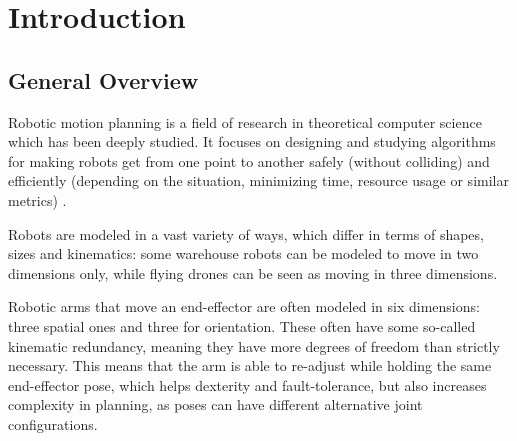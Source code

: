 \section{Introduction}


\subsection{General Overview}

Robotic motion planning is a field of research in theoretical computer science which has been deeply studied. 
It focuses on designing and studying algorithms for making robots get from one point to another safely (without colliding) and efficiently (depending on the situation, minimizing time, resource usage or similar metrics) \cite{chosetPrinciplesRobotMotion2005}.

Robots are modeled in a vast variety of ways, which differ in terms of shapes, sizes and kinematics: 
some warehouse robots can be modeled to move in two dimensions only, while flying drones can be seen as moving in three dimensions.

Robotic arms that move an end-effector are often modeled in six dimensions: three spatial ones and three for orientation. 
These often have some so-called kinematic redundancy, meaning they have more degrees of freedom than strictly necessary.
This means that the arm is able to re-adjust while holding the same end-effector pose, which helps dexterity and fault-tolerance, but also increases complexity in planning, as poses can have different alternative joint configurations. 
\cite{sicilianoSpringerHandbookRobotics2016}

